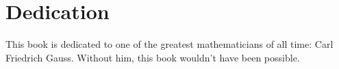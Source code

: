 \chapter{Dedication}
This book is dedicated to one of the greatest mathematicians
of all time: Carl Friedrich Gauss.
Without him, this book wouldn't have been possible.
